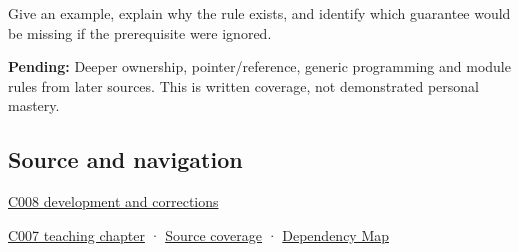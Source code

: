 Give an example, explain why the rule exists, and identify which guarantee would be missing if the prerequisite were ignored.

\textbf{Pending:} Deeper ownership, pointer/reference, generic programming and module rules from later sources. This is written coverage, not demonstrated personal mastery.

\subsection{Source and navigation}\label{appendix-b12b31759da1-source-and-navigation}

\hyperref[appendix-fd090d982a15-m008---parts-113-126]{C008 development and corrections}

\hyperref[01-foundations-i-ch002-a-spelling-needs-a-place-and-a-meaning]{C007 teaching chapter} · \hyperref[appendix-fd090d982a15-m007---parts-101-112]{Source coverage} · \hyperref[appendix-4ad47bdd269a]{Dependency Map}
